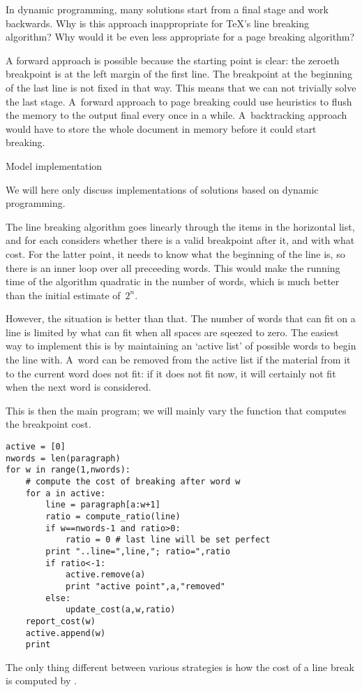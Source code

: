 \begin{594exercise}
In dynamic programming, many solutions start from a final stage and
work backwards. Why is this approach inappropriate for \TeX's
line breaking algorithm? Why would it be even less appropriate for a
page breaking algorithm?
\end{594exercise}
\begin{answer}
A forward approach is possible because the starting point is clear:
the zeroeth breakpoint is at the left margin of the first line. The
breakpoint at the beginning of the last line is not fixed in that
way. This means that we can not trivially solve the last stage.
A~forward approach to page breaking could use heuristics to flush the
memory to the output final every once in a while. A~backtracking
approach would have to store the whole document in memory before it
could start breaking.
\end{answer}

 {Model implementation}

We will here only discuss implementations of solutions based on
dynamic programming.

The line breaking algorithm goes linearly through the items in the
horizontal list, and for each considers whether there is a valid
breakpoint after it, and with what cost. For the latter point, it
needs to know what the beginning of the line is, so there is an inner
loop over all preceeding words. This would make the running time of
the algorithm quadratic in the number of words, which is much better
than the initial estimate of~$2^n$.

However, the situation is better than that. The number of words that
can fit on a line is limited by what can fit when all spaces are
sqeezed to zero. The easiest way to implement this is by maintaining
an `active list' of possible words to begin the line with. A~word can
be removed from the active list if the material from it to the current
word does not fit: if it does not fit now, it will certainly not fit
when the next word is considered.

This is then the main program; we will mainly vary the function that
computes the breakpoint cost.
\begin{verbatim}
active = [0]
nwords = len(paragraph)
for w in range(1,nwords):
    # compute the cost of breaking after word w
    for a in active:
        line = paragraph[a:w+1]
        ratio = compute_ratio(line)
        if w==nwords-1 and ratio>0:
            ratio = 0 # last line will be set perfect
        print "..line=",line,"; ratio=",ratio
        if ratio<-1:
            active.remove(a)
            print "active point",a,"removed"
        else:
            update_cost(a,w,ratio)
    report_cost(w)
    active.append(w)
    print
\end{verbatim}
The only thing different between various strategies is how the cost of
a line break is computed by .


